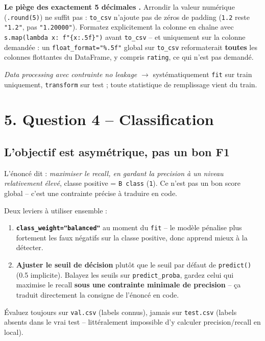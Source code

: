 \documentclass[11pt]{article}
\newcommand{\exhead}[1]{\subsection{#1}}
\begin{document}
\begin{trap}
\textbf{Le pi\`ege des \og exactement 5 d\'ecimales \fg.} Arrondir la
valeur num\'erique (\texttt{.round(5)}) ne suffit pas : \texttt{to\_csv}
n'ajoute pas de z\'eros de padding (\texttt{1.2} reste \texttt{"1.2"}, pas
\texttt{"1.20000"}). Formatez explicitement la colonne en cha\^ine avec
\texttt{s.map(lambda x: f"\{x:.5f\}")} avant \texttt{to\_csv} -- et
uniquement sur la colonne demand\'ee : un \texttt{float\_format="\%.5f"}
global sur \texttt{to\_csv} reformaterait \textbf{toutes} les colonnes
flottantes du DataFrame, y compris \texttt{rating}, ce qui n'est pas
demand\'e.
\end{trap}

\begin{pat}
\emph{\og Data processing avec contrainte no leakage \fg} $\to$
syst\'ematiquement \texttt{fit} sur train uniquement, \texttt{transform}
sur test ; toute statistique de remplissage vient du train.
\end{pat}

\section{5. Question 4 -- Classification}

\exhead{L'objectif est asym\'etrique, pas un bon F1}
L'\'enonc\'e dit : \emph{maximiser le recall, en gardant la precision \`a
un niveau relativement \'elev\'e}, classe positive = \texttt{B class}
(\texttt{1}). Ce n'est pas \og un bon score global \fg -- c'est une
contrainte pr\'ecise \`a traduire en code.

\begin{explik}
Deux leviers \`a utiliser ensemble :
\begin{enumerate}[nosep]
  \item \textbf{\texttt{class\_weight="balanced"}} au moment du
        \texttt{fit} -- le mod\`ele p\'enalise plus fortement les faux
        n\'egatifs sur la classe positive, donc apprend mieux \`a la
        d\'etecter.
  \item \textbf{Ajuster le seuil de d\'ecision} plut\^ot que le seuil par
        d\'efaut de \texttt{predict()} (0.5 implicite). Balayez les seuils
        sur \texttt{predict\_proba}, gardez celui qui maximise le recall
        \textbf{sous une contrainte minimale de precision} -- \c{c}a
        traduit directement la consigne de l'\'enonc\'e en code.
\end{enumerate}
\'Evaluez toujours sur \texttt{val.csv} (labels connus), jamais sur
\texttt{test.csv} (labels absents dans le vrai test -- litt\'eralement
impossible d'y calculer precision/recall en local).
\end{explik}
\end{document}
